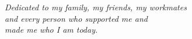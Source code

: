 
\begin{dedication} %

\textit{Dedicated to my family, my friends, my workmates\\
and every person who supported me and\\
made me who I am today.}

\bigbreak

\bigbreak


\end{dedication}

